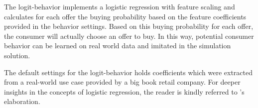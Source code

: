 %
%

The logit-behavior implements a logistic regression with feature scaling and calculates for each offer the buying probability based on the feature coefficients provided in the behavior settings. Based on this buying probability for each offer, the consumer will actually choose an offer to buy. In this way, potential consumer behavior can be learned on real world data and imitated in the simulation solution.

The default settings for the logit-behavior holds coefficients which were extracted from a real-world use case provided by a big book retail company. For deeper insights in the concepts of logistic regression, the reader is kindly referred to \citet{hosmer2013applied}'s elaboration.

%
